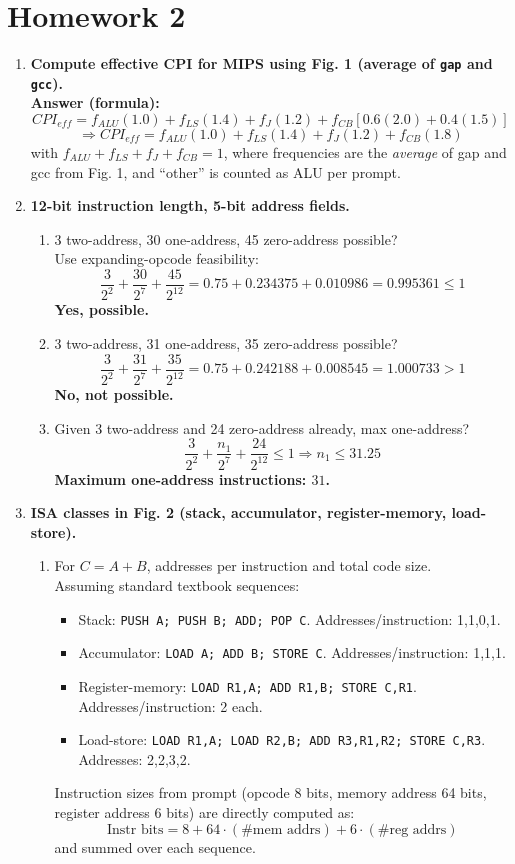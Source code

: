 \documentclass[11pt]{article}
\begin{document}
\section*{Homework 2}
\begin{enumerate}
\item \textbf{Compute effective CPI for MIPS using Fig. 1 (average of \texttt{gap} and \texttt{gcc}).}\\
\textbf{Answer (formula):}
\[
CPI_{eff}=f_{ALU}(1.0)+f_{LS}(1.4)+f_{J}(1.2)+f_{CB}[0.6(2.0)+0.4(1.5)]
\]
\[
\Rightarrow CPI_{eff}=f_{ALU}(1.0)+f_{LS}(1.4)+f_{J}(1.2)+f_{CB}(1.8)
\]
with $f_{ALU}+f_{LS}+f_J+f_{CB}=1$, where frequencies are the \emph{average} of gap and gcc from Fig. 1, and ``other'' is counted as ALU per prompt.

\item \textbf{12-bit instruction length, 5-bit address fields.}
\begin{enumerate}[label=(\alph*)]
\item 3 two-address, 30 one-address, 45 zero-address possible?\\
Use expanding-opcode feasibility:
\[
\frac{3}{2^2}+\frac{30}{2^7}+\frac{45}{2^{12}}=0.75+0.234375+0.010986=0.995361\le 1
\]
\textbf{Yes, possible.}

\item 3 two-address, 31 one-address, 35 zero-address possible?\\
\[
\frac{3}{2^2}+\frac{31}{2^7}+\frac{35}{2^{12}}=0.75+0.242188+0.008545=1.000733>1
\]
\textbf{No, not possible.}

\item Given 3 two-address and 24 zero-address already, max one-address?\\
\[
\frac{3}{2^2}+\frac{n_1}{2^7}+\frac{24}{2^{12}}\le 1
\Rightarrow n_1\le 31.25
\]
\textbf{Maximum one-address instructions: $\boxed{31}$.}
\end{enumerate}

\item \textbf{ISA classes in Fig. 2 (stack, accumulator, register-memory, load-store).}
\begin{enumerate}[label=(\alph*)]
\item For $C=A+B$, addresses per instruction and total code size.\\
Assuming standard textbook sequences:
\begin{itemize}
\item Stack: \texttt{PUSH A; PUSH B; ADD; POP C}. Addresses/instruction: 1,1,0,1.
\item Accumulator: \texttt{LOAD A; ADD B; STORE C}. Addresses/instruction: 1,1,1.
\item Register-memory: \texttt{LOAD R1,A; ADD R1,B; STORE C,R1}. Addresses/instruction: 2 each.
\item Load-store: \texttt{LOAD R1,A; LOAD R2,B; ADD R3,R1,R2; STORE C,R3}. Addresses: 2,2,3,2.
\end{itemize}
Instruction sizes from prompt (opcode 8 bits, memory address 64 bits, register address 6 bits) are directly computed as:
\[
\text{Instr bits}=8 + 64\cdot(\#\text{mem addrs})+6\cdot(\#\text{reg addrs})
\]
and summed over each sequence.


\end{enumerate}
\end{enumerate}
\end{document}
